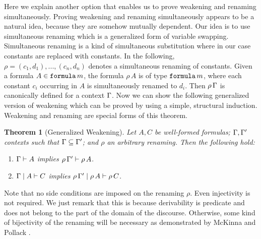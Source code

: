 \documentclass{kms-j}
\theoremstyle{plain}
\newtheorem{thm}{Theorem}[section]
\theoremstyle{remark}
\begin{document}
Here we explain another option that enables us to prove weakening and renaming simultaneously.
Proving weakening and renaming simultaneously appears to be a natural
idea, because they are somehow mutually dependent.
Our idea is to use simultaneous renaming which is a generalized form of variable swapping.
Simultaneous renaming is a kind of simultaneous substitution
where in our case constants are replaced with constants.
In the following, $\rho = (c_1,d_1),...,(c_n, d_n)$ denotes a simultaneous renaming of constants.
Given a formula $A \in \textup{\tt formula} \, m$, the formula $\rho \, A$ is of
type $\textup{\tt formula} \, m$, where each constant $c_i$ occurring in $A$ is simultaneously renamed to $d_i$.
Then $\rho\,\Gamma$ is canonically defined for a context $\Gamma$.
Now we can  show the following generalized version of weakening
which can be proved by using a simple, structural induction.
Weakening and renaming are special forms of this theorem.

\begin{thm}[Generalized Weakening]\label{gen-weakening}
    Let $A, C$ be well-formed formulas; $\Gamma, \Gamma'$ contexts such that
    $\Gamma \subseteq \Gamma'$; and $\rho$ an arbitrary renaming. Then the following hold:
  \begin{enumerate}
  \item $\Gamma \vdash A$ implies $\rho\, \Gamma' \vdash \rho\, A$.
  \item $\Gamma \mid A \vdash C$ implies $\rho\, \Gamma' \mid \rho\, A \vdash \rho\, C$.
  \end{enumerate}
\end{thm}

Note that no side conditions are imposed on the renaming $\rho$.
Even injectivity is not required.
We just remark that this is because derivability is predicate and does not belong
to the part of the domain of the discourse.
Otherwise, some kind of bijectivity of the renaming will be necessary
as demonstrated by McKinna and Pollack \citep{McKinna1999}.
\end{document}
